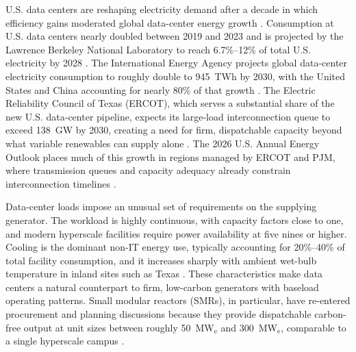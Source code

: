 \documentclass[a4paper,fleqn]{cas-sc}
\begin{document}
U.S. data centers are reshaping electricity demand after a decade in which efficiency gains moderated global data-center energy growth \citep{masanet2020datacenter}. Consumption at U.S. data centers nearly doubled between 2019 and 2023 and is projected by the Lawrence Berkeley National Laboratory to reach 6.7\%--12\% of total U.S. electricity by 2028 \citep{shehabi2024}. The International Energy Agency projects global data-center electricity consumption to roughly double to 945~TWh by 2030, with the United States and China accounting for nearly 80\% of that growth \citep{iea2024electricity,iea2025energyAi}. The Electric Reliability Council of Texas (ERCOT), which serves a substantial share of the new U.S. data-center pipeline, expects its large-load interconnection queue to exceed 138~GW by 2030, creating a need for firm, dispatchable capacity beyond what variable renewables can supply alone \citep{ercot2025longterm}. The 2026 U.S. Annual Energy Outlook places much of this growth in regions managed by ERCOT and PJM, where transmission queues and capacity adequacy already constrain interconnection timelines \citep{eia2026aeo}.

Data-center loads impose an unusual set of requirements on the supplying generator. The workload is highly continuous, with capacity factors close to one, and modern hyperscale facilities require power availability at five nines or higher. Cooling is the dominant non-IT energy use, typically accounting for 20\%--40\% of total facility consumption, and it increases sharply with ambient wet-bulb temperature in inland sites such as Texas \citep{greenGrid2012pue,ashrae2021thermal}. These characteristics make data centers a natural counterpart to firm, low-carbon generators with baseload operating patterns. Small modular reactors (SMRs), in particular, have re-entered procurement and planning discussions because they provide dispatchable carbon-free output at unit sizes between roughly 50~MW$_\mathrm{e}$ and 300~MW$_\mathrm{e}$, comparable to a single hyperscale campus \citep{mignacca2020smrFinance,doe2024liftoff,atb2024nuclear,asuega2023}.
\end{document}
